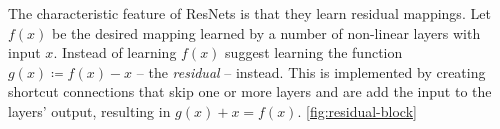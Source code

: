 The characteristic feature of ResNets is that they learn residual mappings.
Let $f(x)$ be the desired mapping learned by a number of non-linear layers with input $x$.
Instead of learning $f(x)$ \citet{he16} suggest learning the function $g(x) \coloneqq f(x) - x$ -- the \emph{residual} -- instead.
This is implemented by creating shortcut connections that skip one or more layers and are add the input to the layers' output, resulting in $g(x) + x = f(x)$.
\cref{fig:residual-block}